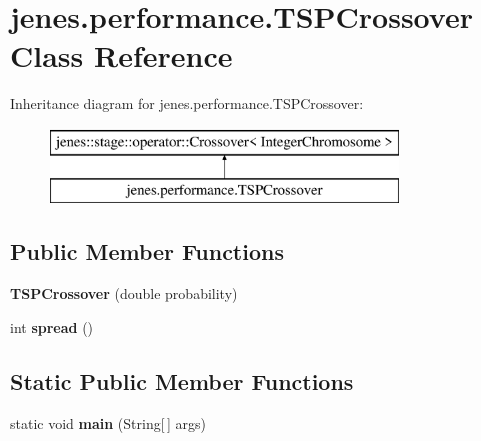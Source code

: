 \hypertarget{classjenes_1_1performance_1_1_t_s_p_crossover}{\section{jenes.\-performance.\-T\-S\-P\-Crossover Class Reference}
\label{classjenes_1_1performance_1_1_t_s_p_crossover}
}
Inheritance diagram for jenes.\-performance.\-T\-S\-P\-Crossover\-:\begin{figure}[H]
\begin{center}
\leavevmode
\includegraphics[height=2.000000cm]{classjenes_1_1performance_1_1_t_s_p_crossover}
\end{center}
\end{figure}
\subsection*{Public Member Functions}
\begin{DoxyCompactItemize}
\item 
\hypertarget{classjenes_1_1performance_1_1_t_s_p_crossover_a176bd2a0297786392cb4a8f5865cf97a}{{\bfseries T\-S\-P\-Crossover} (double probability)}\label{classjenes_1_1performance_1_1_t_s_p_crossover_a176bd2a0297786392cb4a8f5865cf97a}

\item 
\hypertarget{classjenes_1_1performance_1_1_t_s_p_crossover_a08d867a3840e1c4ce0d9e57f5f21c839}{int {\bfseries spread} ()}\label{classjenes_1_1performance_1_1_t_s_p_crossover_a08d867a3840e1c4ce0d9e57f5f21c839}

\end{DoxyCompactItemize}
\subsection*{Static Public Member Functions}
\begin{DoxyCompactItemize}
\item 
\hypertarget{classjenes_1_1performance_1_1_t_s_p_crossover_a13d3ceed0ac0f7ec8a8d428e511d5669}{static void {\bfseries main} (String\mbox{[}$\,$\mbox{]} args)}\label{classjenes_1_1performance_1_1_t_s_p_crossover_a13d3ceed0ac0f7ec8a8d428e511d5669}

\end{DoxyCompactItemize}
